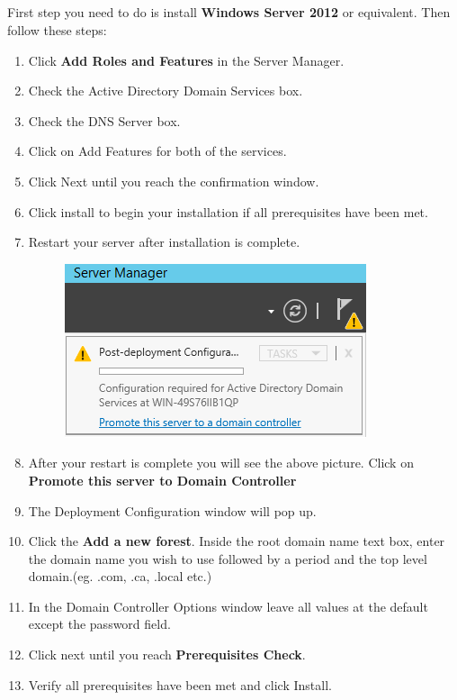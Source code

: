\documentclass{article}
\begin{document}
\subsection{}
First step you need to do is install \textbf{Windows Server 2012} or equivalent.
Then follow these steps:
\begin{enumerate}
\item Click \textbf{Add Roles and Features} in the Server Manager.
\item Check the Active Directory Domain Services box.
\item Check the DNS Server box.
\item Click on Add Features for both of the services.
\item Click Next until you reach the confirmation window. 
\item Click install to begin your installation if all prerequisites have been met.
\item Restart your server after installation is complete.
\begin{figure}[h]
	\centering
	\includegraphics[width=.45\linewidth, height=.15\textheight]{PDC/install4}
\end{figure}
\item After your restart is complete you will see the above picture. Click on \textbf{Promote this server to Domain Controller}
\item The Deployment Configuration window will pop up.
\item Click the \textbf{Add a new forest}. Inside the root domain name text box, enter the domain name you wish to use followed by a period and the top level domain.(eg. .com, .ca, .local etc.)
\item In the Domain Controller Options window leave all values at the default except the password field.
\item Click next until you reach \textbf{Prerequisites Check}.
\item Verify all prerequisites have been met and click Install.
\end{enumerate}
\end{document}

